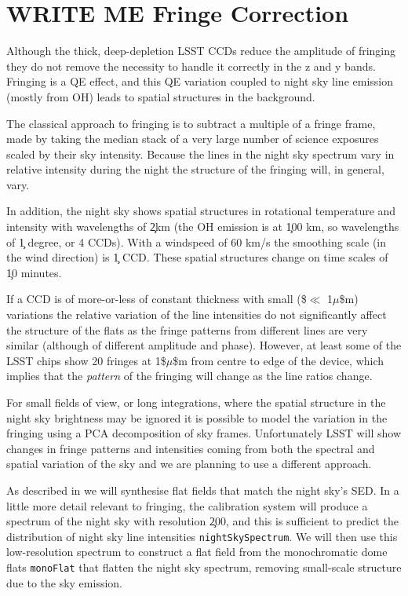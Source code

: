 \documentclass[DM,authoryear,toc,lsstdraft]{lsstdoc}
\newcommand{\inputData}[1]{\texttt{#1}}
\newcommand{\calypsoData}[1]{\texttt{#1}}
\begin{document}
\section{WRITE ME Fringe Correction}

Although the thick, deep-depletion LSST CCDs reduce the amplitude of fringing they do not remove the necessity
to handle it correctly in the z and y bands.  Fringing is a QE effect, and this QE variation coupled to night
sky line emission (mostly from OH) leads to spatial structures in the background.

The classical approach to fringing is to subtract a multiple of a fringe frame, made by taking the median
stack of a very large number of science exposures scaled by their sky intensity.  Because the lines in the
night sky spectrum vary in relative intensity during the night the structure of the
fringing will, in general, vary.

In addition, the night sky shows spatial structures in rotational temperature and intensity with wavelengths
of \c 2km (the OH emission is at \c 100 km, so wavelengths of \c 1 degree, or 4 CCDs).  With a
windspeed of 60 km/s the smoothing scale (in the wind direction) is \c 1 CCD.  These spatial structures change
on time scales of \c 10 minutes.

If a CCD is of more-or-less of constant thickness with small (\$$\ll$ 1$\mu$\$m) variations the relative variation
of the line intensities do not significantly affect the structure of the flats as the fringe patterns from
different lines are very similar (although of different amplitude and phase).  However, at least some of the
LSST chips show 20 fringes at 1\$$\mu$\$m from centre to edge of the device, which implies that the
\textit{pattern} of the fringing will change as the line ratios change.

For small fields of view, or long integrations, where the spatial structure in the night sky brightness may be
ignored it is possible to model the variation in the fringing using a PCA decomposition of sky frames.
Unfortunately LSST will show changes in fringe patterns and intensities coming from both the spectral and
spatial variation of the sky and we are planning to use a different approach.

As described in  we will synthesise flat fields that match the night sky's SED.  In a
little more detail relevant to fringing, the calibration system will produce a spectrum of the night sky with
resolution \c 200, and this is sufficient to predict the distribution of night sky line intensities
\calypsoData{nightSkySpectrum}.  We will then use this low-resolution spectrum to construct a flat field from
the monochromatic dome flats \inputData{monoFlat} that flatten the night sky spectrum, removing small-scale
structure due to the sky emission.
\end{document}
